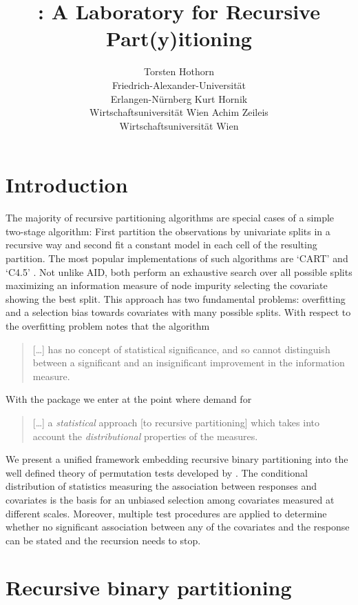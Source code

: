 \documentclass{Z}
\title{\pkg{party}: A Laboratory for Recursive Part(y)itioning}
\author{Torsten Hothorn\\Friedrich-Alexander-Universit\"at\\Erlangen-N\"urnberg
   \And Kurt Hornik\\Wirtschaftsuniversit\"at Wien
   \And Achim Zeileis\\Wirtschaftsuniversit\"at Wien}
\begin{document}


\section{Introduction}

The majority of recursive partitioning algorithms 
are special cases of a simple two-stage algorithm: 
First partition the observations by univariate splits in a recursive way and
second fit a constant model in each cell of the resulting partition.
The most popular implementations of such algorithms are `CART' 
\citep{classifica:1984} and `C4.5' \citep{Quinlan1993}. Not unlike AID,   
both perform an exhaustive search over all possible splits maximizing an
information measure of node impurity selecting the 
covariate showing the best split.
This approach has two fundamental problems: overfitting and a selection 
bias towards covariates with many possible splits. 
With respect to the 
overfitting problem \cite{Mingers1987} notes that the algorithm
\begin{quote}
[\ldots] has no concept of statistical significance, and so cannot
distinguish between a significant and an insignificant improvement in the
information measure.
\end{quote}
With the  package \citep[see][for a full description of its
methodological foundations]{Hothorn+Hornik+Zeileis:2006a}
we enter at the point where \cite{WhiteLiu1994} demand for
\begin{quote}
[\ldots] a \textit{statistical} approach [to recursive partitioning] which
takes
into account the \textit{distributional} properties of the measures.
\end{quote} 
We present a unified framework embedding recursive binary partitioning into
the well defined theory of permutation tests developed by
\cite{StrasserWeber1999}.
The conditional distribution of statistics measuring the association between
responses and covariates is the basis for an unbiased selection among
covariates measured at different scales. 
Moreover, multiple test procedures are applied to determine whether no
significant
association between any of the covariates and the response can be stated and 
the recursion needs to stop.

\clearpage

\section{Recursive binary partitioning} \label{algo}
\end{document}

